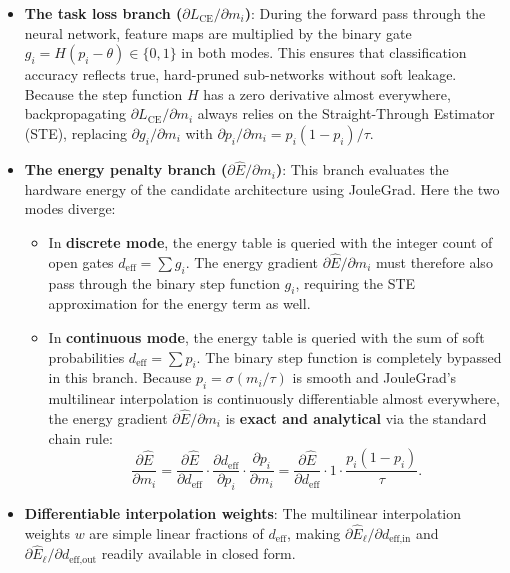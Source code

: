 \begin{itemize}
    \item \textbf{The task loss branch ($\partial L_{\text{CE}} / \partial m_i$)}:
    During the forward pass through the neural network, feature maps are multiplied by the binary gate $g_i = H(p_i - \theta) \in \{0, 1\}$ in both modes. This ensures that classification accuracy reflects true, hard-pruned sub-networks without soft leakage. Because the step function $H$ has a zero derivative almost everywhere, backpropagating $\partial L_{\text{CE}} / \partial m_i$ always relies on the Straight-Through Estimator (STE), replacing $\partial g_i / \partial m_i$ with $\partial p_i / \partial m_i = p_i (1 - p_i) / \tau$.
    
    \item \textbf{The energy penalty branch ($\partial \widehat{E} / \partial m_i$)}:
    This branch evaluates the hardware energy of the candidate architecture using JouleGrad. Here the two modes diverge:
    \begin{itemize}
        \item In \textbf{discrete mode}, the energy table is queried with the integer count of open gates $d_{\text{eff}} = \sum g_i$. The energy gradient $\partial \widehat{E} / \partial m_i$ must therefore also pass through the binary step function $g_i$, requiring the STE approximation for the energy term as well.
        \item In \textbf{continuous mode}, the energy table is queried with the sum of soft probabilities $d_{\text{eff}} = \sum p_i$. The binary step function is completely bypassed in this branch. Because $p_i = \sigma(m_i / \tau)$ is smooth and JouleGrad's multilinear interpolation is continuously differentiable almost everywhere, the energy gradient $\partial \widehat{E} / \partial m_i$ is \textbf{exact and analytical} via the standard chain rule:
        $$
        \frac{\partial \widehat{E}}{\partial m_i} = \frac{\partial \widehat{E}}{\partial d_{\text{eff}}} \cdot \frac{\partial d_{\text{eff}}}{\partial p_i} \cdot \frac{\partial p_i}{\partial m_i} = \frac{\partial \widehat{E}}{\partial d_{\text{eff}}} \cdot 1 \cdot \frac{p_i(1 - p_i)}{\tau}.
        $$
    \end{itemize}
    
    \item \textbf{Differentiable interpolation weights}:
    The multilinear interpolation weights $w$ are simple linear fractions of $d_{\text{eff}}$, making $\partial \widehat{E}_\ell / \partial d_{\text{eff,in}}$ and $\partial \widehat{E}_\ell / \partial d_{\text{eff,out}}$ readily available in closed form.
\end{itemize}

